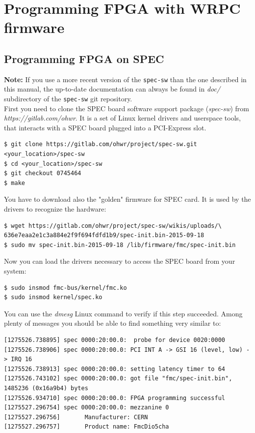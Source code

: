 \documentclass[a4paper, 12pt]{article}
\renewcommand{\_}{\underscore\allowbreak}
\begin{document}
\newpage
\section{Programming FPGA with WRPC firmware}
\label{Programming FPGA}

\subsection{Programming FPGA on SPEC}
\label{Programming FPGA on SPEC}

\textbf{Note:} If you use a more recent version of the \texttt{spec-sw} than the
one described in this manual, the up-to-date documentation can always be found
in \textit{doc/} subdirectory of the \texttt{spec-sw} git repository.\\

First you need to clone the SPEC board software support package
(\textit{spec-sw}) from \textit{https://gitlab.com/ohwr}.
It is a set of Linux kernel drivers and
userspace tools, that interacts with a SPEC board plugged into a PCI-Express
slot.\\

\begin{lstlisting}
$ git clone https://gitlab.com/ohwr/project/spec-sw.git <your_location>/spec-sw
$ cd <your_location>/spec-sw
$ git checkout 0745464
$ make
\end{lstlisting}

You have to download also the "golden" firmware for SPEC card. It is used by
the drivers to recognize the hardware:
\begin{lstlisting}
$ wget https://gitlab.com/ohwr/project/spec-sw/wikis/uploads/\
636e7eaa2e1c3a884e2f9f694fdfd1b9/spec-init.bin-2015-09-18
$ sudo mv spec-init.bin-2015-09-18 /lib/firmware/fmc/spec-init.bin
\end{lstlisting}

Now you can load the drivers necessary to access the SPEC board from your
system:
\begin{lstlisting}
$ sudo insmod fmc-bus/kernel/fmc.ko
$ sudo insmod kernel/spec.ko
\end{lstlisting}

You can use the \textit{dmesg} Linux command to verify if this step succeeded.
Among plenty of messages you should be able to find something very similar to:
\begin{lstlisting}[basicstyle=\scriptsize\ttfamily]
[1275526.738895] spec 0000:20:00.0:  probe for device 0020:0000
[1275526.738906] spec 0000:20:00.0: PCI INT A -> GSI 16 (level, low) -> IRQ 16
[1275526.738913] spec 0000:20:00.0: setting latency timer to 64
[1275526.743102] spec 0000:20:00.0: got file "fmc/spec-init.bin", 1485236 (0x16a9b4) bytes
[1275526.934710] spec 0000:20:00.0: FPGA programming successful
[1275527.296754] spec 0000:20:00.0: mezzanine 0
[1275527.296756]       Manufacturer: CERN
[1275527.296757]       Product name: FmcDio5cha
\end{lstlisting}
\end{document}
